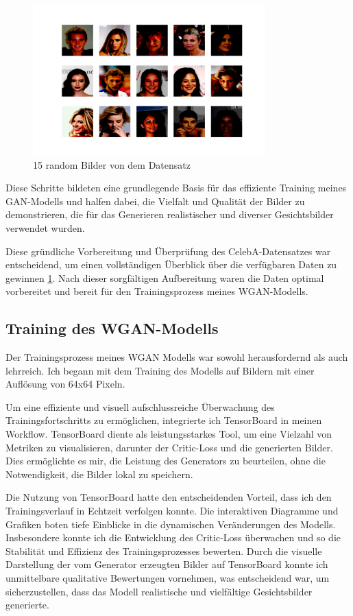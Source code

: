 \documentclass[a4paper, 12pt]{article}
\begin{document}
\begin{figure}[ht]
\centering
\includegraphics[width=0.8\textwidth]{./img/data_faces.png}
\caption{15 random Bilder von dem Datensatz}
\label{fig:random_faces}
\end{figure}

Diese Schritte bildeten eine grundlegende Basis für das effiziente Training meines GAN-Modells und halfen dabei, die Vielfalt und Qualität der Bilder zu demonstrieren, die für das Generieren realistischer und diverser Gesichtsbilder verwendet wurden.


Diese gründliche Vorbereitung und Überprüfung des CelebA-Datensatzes war entscheidend, um einen vollständigen Überblick über die verfügbaren Daten zu gewinnen \ref{fig:random_faces}. Nach dieser sorgfältigen Aufbereitung waren die Daten optimal vorbereitet und bereit für den Trainingsprozess meines WGAN-Modells.


\subsection{Training des WGAN-Modells}
Der Trainingsprozess meines WGAN Modells war sowohl herausfordernd als auch lehrreich. Ich begann mit dem Training des Modells auf Bildern mit einer Auflösung von 64x64 Pixeln.

Um eine effiziente und visuell aufschlussreiche Überwachung des Trainingsfortschritts zu ermöglichen, integrierte ich TensorBoard in meinen Workflow. TensorBoard diente als leistungsstarkes Tool, um eine Vielzahl von Metriken zu visualisieren, darunter der Critic-Loss und die generierten Bilder. Dies ermöglichte es mir, die Leistung des Generators zu beurteilen, ohne die Notwendigkeit, die Bilder lokal zu speichern.

Die Nutzung von TensorBoard hatte den entscheidenden Vorteil, dass ich den Trainingsverlauf in Echtzeit verfolgen konnte. Die interaktiven Diagramme und Grafiken boten tiefe Einblicke in die dynamischen Veränderungen des Modells. Insbesondere konnte ich die Entwicklung des Critic-Loss überwachen und so die Stabilität und Effizienz des Trainingsprozesses bewerten. Durch die visuelle Darstellung der vom Generator erzeugten Bilder auf TensorBoard konnte ich unmittelbare qualitative Bewertungen vornehmen, was entscheidend war, um sicherzustellen, dass das Modell realistische und vielfältige Gesichtsbilder generierte.
\end{document}
